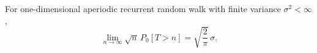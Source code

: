 For one-dimensional aperiodic recurrent random walk with finite variance $\sigma^2 < \infty$,
$$\lim_{n \to \infty} \sqrt{n} \, P_0[T > n] = \sqrt{\frac{2}{\pi}} \, \sigma.$$
